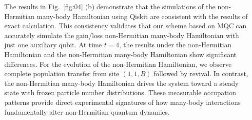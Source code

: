 \documentclass[longbibliography, aps, prx, amsmath, amssymb, amsfonts, twocolumn,superscriptaddress, footinbib]{revtex4-1}
\begin{document}
	The results in Fig.~\ref{fig:04} (b) demonstrate that the simulations of the non-Hermitian many-body Hamiltonian using Qiskit are consistent with the results of exact calculation. This consistency validates that our scheme based on MQC can accurately simulate the gain/loss non-Hermitian many-body Hamiltonian with just one auxiliary qubit. 
	At time $t=4$, the results under the non-Hermitian Hamiltonian and the non-Hermitian many-body Hamiltonian show significant differences. 
	For the evolution of the non-Hermitian Hamiltonian, we observe complete population transfer from site $(1,1,B)$ followed by revival.
	In contrast, the non-Hermitian many-body Hamiltonian drives the system toward a steady state with frozen particle number distributions.
	These measurable occupation patterns provide direct experimental signatures of how many-body interactions fundamentally alter non-Hermitian quantum dynamics.
	
\end{document}
